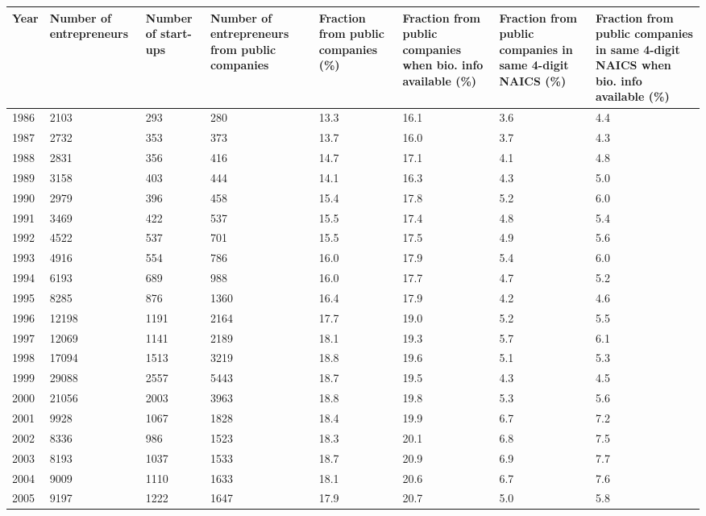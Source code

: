 \begin{table}[!htb]
\centering
\begingroup\scriptsize
\begin{tabular}{p{1.75cm}p{1.75cm}p{1.75cm}p{1.75cm}p{1.75cm}p{1.75cm}p{1.75cm}p{1.75cm}}
  \toprule
Year & Number of entrepreneurs & Number of start-ups & Number of entrepreneurs from public companies & Fraction from public companies (\%) & Fraction from public companies when bio. info available (\%) & Fraction from public companies in same 4-digit NAICS (\%) & Fraction from public companies in same 4-digit NAICS when bio. info available (\%) \\ 
  \midrule
1986 & 2103 & 293 & 280 & 13.3 & 16.1 & 3.6 & 4.4 \\ 
  1987 & 2732 & 353 & 373 & 13.7 & 16.0 & 3.7 & 4.3 \\ 
  1988 & 2831 & 356 & 416 & 14.7 & 17.1 & 4.1 & 4.8 \\ 
  1989 & 3158 & 403 & 444 & 14.1 & 16.3 & 4.3 & 5.0 \\ 
  1990 & 2979 & 396 & 458 & 15.4 & 17.8 & 5.2 & 6.0 \\ 
  1991 & 3469 & 422 & 537 & 15.5 & 17.4 & 4.8 & 5.4 \\ 
  1992 & 4522 & 537 & 701 & 15.5 & 17.5 & 4.9 & 5.6 \\ 
  1993 & 4916 & 554 & 786 & 16.0 & 17.9 & 5.4 & 6.0 \\ 
  1994 & 6193 & 689 & 988 & 16.0 & 17.7 & 4.7 & 5.2 \\ 
  1995 & 8285 & 876 & 1360 & 16.4 & 17.9 & 4.2 & 4.6 \\ 
  1996 & 12198 & 1191 & 2164 & 17.7 & 19.0 & 5.2 & 5.5 \\ 
  1997 & 12069 & 1141 & 2189 & 18.1 & 19.3 & 5.7 & 6.1 \\ 
  1998 & 17094 & 1513 & 3219 & 18.8 & 19.6 & 5.1 & 5.3 \\ 
  1999 & 29088 & 2557 & 5443 & 18.7 & 19.5 & 4.3 & 4.5 \\ 
  2000 & 21056 & 2003 & 3963 & 18.8 & 19.8 & 5.3 & 5.6 \\ 
  2001 & 9928 & 1067 & 1828 & 18.4 & 19.9 & 6.7 & 7.2 \\ 
  2002 & 8336 & 986 & 1523 & 18.3 & 20.1 & 6.8 & 7.5 \\ 
  2003 & 8193 & 1037 & 1533 & 18.7 & 20.9 & 6.9 & 7.7 \\ 
  2004 & 9009 & 1110 & 1633 & 18.1 & 20.6 & 6.7 & 7.6 \\ 
  2005 & 9197 & 1222 & 1647 & 17.9 & 20.7 & 5.0 & 5.8 \\ 

\end{tabular}
\end{table}
